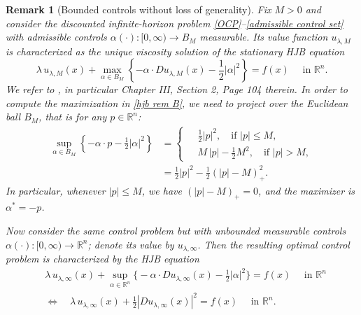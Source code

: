 \documentclass[12pt]{amsart}
\numberwithin{equation}{section}
\theoremstyle{plain}
\newtheorem{remark}[theorem]{Remark}
\begin{document}
\begin{remark}[Bounded controls without loss of generality]\label{rem: bounded controls}
Fix $M>0$ and consider the discounted infinite-horizon problem \eqref{OCP}--\eqref{admissible control set} with admissible controls $\alpha(\cdot):[0,\infty)\to B_M$ measurable. Its value function $u_{\lambda,M}$ is characterized as the unique viscosity solution of the stationary HJB equation
\begin{equation}\label{hjb rem B}
    \lambda\,u_{\lambda,M}(x) + \max\limits_{\alpha\in B_{M}}\left\{-\alpha\cdot Du_{\lambda,M}(x) - \frac{1}{2}|\alpha|^{2}\right\} = f(x) \quad \text{ in } \mathbb{R}^{n}.
\end{equation}
We refer to \cite{bardi1997optimal}, in particular Chapter III, Section 2, Page 104 therein.
In order to compute the maximization in \eqref{hjb rem B}, we need to project over the Euclidean ball $B_M$, that is for any $p\in \mathbb{R}^n$:
\begin{equation}\label{ball_sup_formula}
\begin{aligned}
    \sup\limits_{\alpha\in B_{M}}\left\{ - \alpha \cdot p - \frac{1}{2}|\alpha|^{2}\right\}
    & =
    \left\{\;
    \begin{aligned}
        & \frac{1}{2}|p|^{2}, \quad \text{if } |p|\leq M,\\
        & M\,|p| - \frac{1}{2}M^2, \quad \text{if } |p|>M,
    \end{aligned}
    \right.
    \\
    & = \frac{1}{2}|p|^{2} - \frac{1}{2}(|p| - M)^{2}_{+}.
\end{aligned}
\end{equation}
In particular, whenever $|p|\leq M$, we have $(|p| - M)_{+} = 0$, and the maximizer is $\alpha^\ast=-p$.

Now consider the same control problem but with \emph{unbounded} measurable controls $\alpha(\cdot):[0,\infty)\to\mathbb{R}^n$; denote its value by $u_{\lambda,\infty}$. Then the resulting optimal control problem is characterized by the HJB equation
\begin{equation}\label{hjb rem R}
\begin{aligned}
&\lambda\,u_{\lambda,\infty}(x)+\sup_{\alpha\in\mathbb{R}^n}\Big\{-\alpha\cdot Du_{\lambda,\infty}(x)-\tfrac12|\alpha|^2\Big\}=f(x) \quad \text{ in } \mathbb{R}^{n}\\
&\Longleftrightarrow\quad
\lambda\,u_{\lambda,\infty}(x)+\tfrac12|Du_{\lambda,\infty}(x)|^2=f(x) \quad \text{ in } \mathbb{R}^{n}.
\end{aligned}
\end{equation}


\end{remark}
\end{document}
